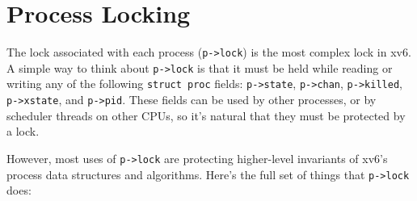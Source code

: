 \section{Process Locking}

The lock associated with each process (\lstinline{p->lock}) is the
most complex lock in xv6.
A simple way to think about \lstinline{p->lock} is
that it must be held while reading or writing any of the following
\lstinline{struct proc} fields:
\lstinline{p->state},
\lstinline{p->chan},
\lstinline{p->killed},
\lstinline{p->xstate},
and
\lstinline{p->pid}.
These fields can be used by other processes, or by scheduler
threads on other CPUs, so it's natural that they
must be protected by a lock.

However, most uses of \lstinline{p->lock} are protecting higher-level
invariants of xv6's process data structures and algorithms. Here's
the full set of things that \lstinline{p->lock} does:



